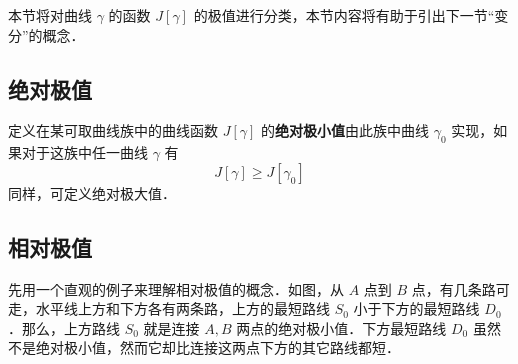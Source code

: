 

本节将对曲线 $\gamma$ 的函数 $J[\gamma]$ 的极值进行分类，本节内容将有助于引出下一节“变分”的概念．

\subsection{绝对极值}
定义在某可取曲线族中的曲线函数 $J[\gamma]$ 的\textbf{绝对极小值}由此族中曲线 $\gamma_0$ 实现，如果对于这族中任一曲线 $\gamma$ 有
\begin{equation}
J[\gamma]\geq J[\gamma_0]
\end{equation}
同样，可定义绝对极大值．
\subsection{相对极值}
先用一个直观的例子来理解相对极值的概念．如图，从 $A$ 点到 $B$ 点，有几条路可走，水平线上方和下方各有两条路，上方的最短路线 $S_0$ 小于下方的最短路线 $D_0$ ．那么，上方路线 $S_0$ 就是连接 $A,B$ 两点的绝对极小值．下方最短路线 $D_0$ 虽然不是绝对极小值，然而它却比连接这两点下方的其它路线都短． 